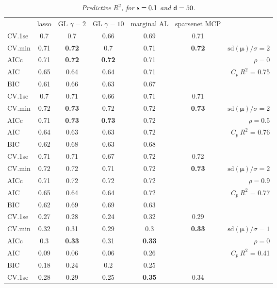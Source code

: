 \documentclass[12pt]{article}
\newcommand{\mr}[1]{\mathrm{#1}}
\newcommand{\bm}[1]{\mathbf{#1}}
\begin{document}
\begin{table}[p]\vspace{-.5cm}
\caption[l]{\label{r2}\it Predictive $R^2$, for ${\sf s}=0.1$ and  ${\sf d}=50$.}
\vspace{-.5cm}
\small{}
\begin{center}
\begin{tabular}{l*{5}{c}|r}
 & lasso & GL $\gamma=2$ & GL $\gamma=10$ & marginal AL & sparsenet MCP  &  \\
\cline{1-7}
CV.1se & 0.7 & 0.7 & 0.66 & 0.69 & 0.71 &\\
CV.min & 0.71 & {\bf 0.72} & 0.7 & 0.71 & {\bf 0.72} &  $\mr{sd}(\bm{\mu})/\sigma=2$ \\
AICc & 0.71 & {\bf 0.72} & {\bf 0.72} & 0.71 & & $\rho=0$ \\
AIC & 0.65 & 0.64 & 0.64 & 0.71 & & \multirow{2}{*}{$C_p ~ R^2$ = 0.75} \\
BIC & 0.61 & 0.66 & 0.63 & 0.67 & & \\
 \hline 
CV.1se & 0.7 & 0.71 & 0.66 & 0.71 & 0.71 &\\
CV.min & 0.72 & {\bf 0.73} & 0.72 & 0.72 & {\bf 0.73} &  $\mr{sd}(\bm{\mu})/\sigma=2$ \\
AICc & 0.71 & {\bf 0.73} & {\bf 0.73} & 0.72 & & $\rho=0.5$ \\
AIC & 0.64 & 0.63 & 0.63 & 0.72 & & \multirow{2}{*}{$C_p ~ R^2$ = 0.76} \\
BIC & 0.62 & 0.68 & 0.63 & 0.68 & & \\
 \hline 
CV.1se & 0.71 & 0.71 & 0.67 & 0.72 & 0.72 &\\
CV.min & 0.72 & 0.72 & 0.71 & 0.72 & {\bf 0.73} &  $\mr{sd}(\bm{\mu})/\sigma=2$ \\
AICc & 0.71 & 0.72 & 0.72 & 0.72 & & $\rho=0.9$ \\
AIC & 0.65 & 0.64 & 0.64 & 0.72 & & \multirow{2}{*}{$C_p ~ R^2$ = 0.77} \\
BIC & 0.62 & 0.69 & 0.69 & 0.63 & & \\
 \hline 
CV.1se & 0.27 & 0.28 & 0.24 & 0.32 & 0.29 &\\
CV.min & 0.32 & 0.31 & 0.29 & 0.3 & {\bf 0.33} &  $\mr{sd}(\bm{\mu})/\sigma=1$ \\
AICc & 0.3 & {\bf 0.33} & 0.31 & {\bf 0.33} & & $\rho=0$ \\
AIC & 0.09 & 0.06 & 0.06 & 0.26 & & \multirow{2}{*}{$C_p ~ R^2$ = 0.41} \\
BIC & 0.18 & 0.24 & 0.2 & 0.25 & & \\
 \hline 
CV.1se & 0.28 & 0.29 & 0.25 & {\bf 0.35} & 0.34 &\\

\end{tabular}
\end{center}
\end{table}
\end{document}

